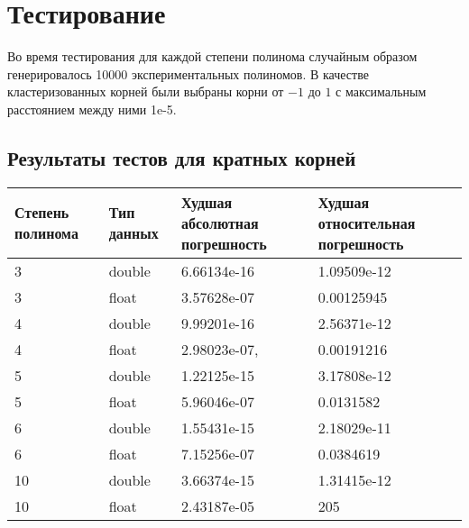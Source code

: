 \documentclass[a4paper,12pt]{article}
\begin{document}
\newpage
\section{Тестирование}
Во время тестирования для каждой степени полинома случайным образом генерировалось 10000 экспериментальных полиномов. В качестве кластеризованных корней были выбраны корни от $-1$ до $1$ с максимальным расстоянием между ними 1e-5.
\subsection{Результаты тестов для кратных корней}
\begin{center}
  \begin{tabular}{|p{2.5cm}|p{3.0cm}|p{5.0cm}|p{5.0cm}|}
  \hline
  \textbf{Степень полинома}  & \textbf{Тип данных} & \textbf{Худшая абсолютная погрешность} & \textbf{Худшая относительная погрешность} \\
  \hline
  3 & double & 6.66134e-16 & 1.09509e-12 \\
  \hline
  3 & float & 3.57628e-07 & 0.00125945 \\
  \hline
  4 & double & 9.99201e-16 & 2.56371e-12 \\
  \hline
  4 & float & 2.98023e-07, & 0.00191216 \\
  \hline
  5 & double & 1.22125e-15 & 3.17808e-12 \\
  \hline
  5 & float & 5.96046e-07 & 0.0131582 \\
  \hline
  6 & double & 1.55431e-15 & 2.18029e-11 \\
  \hline
  6 & float & 7.15256e-07 & 0.0384619 \\
  \hline
  10 & double & 3.66374e-15 & 1.31415e-12 \\
  \hline
  10 & float & 2.43187e-05 & 205 \\
  \hline
\end{tabular}
\label{tab:my_label_2}
\end{center}
\end{document}
